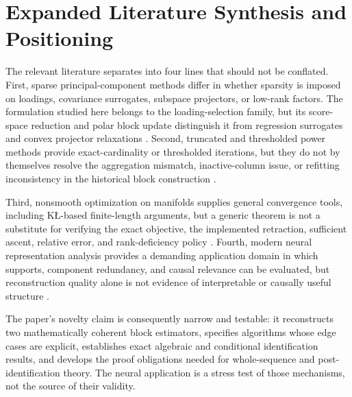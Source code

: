 \section{Expanded Literature Synthesis and Positioning}
\label{sec:expanded-related}
The relevant literature separates into four lines that should not be conflated. First, sparse principal-component methods differ in whether sparsity is imposed on loadings, covariance surrogates, subspace projectors, or low-rank factors. The formulation studied here belongs to the loading-selection family, but its score-space reduction and polar block update distinguish it from regression surrogates and convex projector relaxations \citep{zou2006sparse,daspremont2007direct,vu2013fantope}. Second, truncated and thresholded power methods provide exact-cardinality or thresholded iterations, but they do not by themselves resolve the aggregation mismatch, inactive-column issue, or refitting inconsistency in the historical block construction \citep{yuan2013truncated}.

Third, nonsmooth optimization on manifolds supplies general convergence tools, including KŁ-based finite-length arguments, but a generic theorem is not a substitute for verifying the exact objective, the implemented retraction, sufficient ascent, relative error, and rank-deficiency policy \citep{absil2008optimization,attouch2013convergence,bolte2007lojasiewicz,aktas2025strongly}. Fourth, modern neural representation analysis provides a demanding application domain in which supports, component redundancy, and causal relevance can be evaluated, but reconstruction quality alone is not evidence of interpretable or causally useful structure \citep{mueller2025mib,rajamanoharan2024gated,karvonen2025saebench}.

The paper's novelty claim is consequently narrow and testable: it reconstructs two mathematically coherent block estimators, specifies algorithms whose edge cases are explicit, establishes exact algebraic and conditional identification results, and develops the proof obligations needed for whole-sequence and post-identification theory. The neural application is a stress test of those mechanisms, not the source of their validity.

